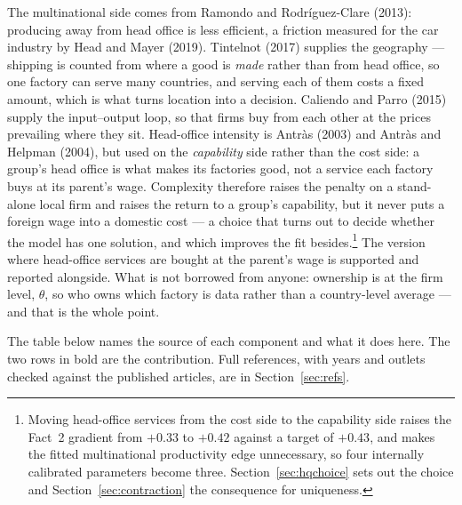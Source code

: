 \documentclass[11pt]{article}
\theoremstyle{plain}
\theoremstyle{remark}
\theoremstyle{definition}
\begin{document}
The multinational side comes from Ramondo and Rodr\'iguez-Clare (2013): producing away
from head office is less efficient, a friction measured for the car industry by Head and
Mayer (2019). Tintelnot (2017) supplies the geography --- shipping is counted from where
a good is \emph{made} rather than from head office, so one factory can serve many
countries, and serving each of them costs a fixed amount, which is what turns location
into a decision. Caliendo and Parro (2015) supply the input--output loop, so that firms
buy from each other at the prices prevailing where they sit. Head-office intensity is
Antr\`as (2003) and Antr\`as and Helpman (2004), but used on the \emph{capability} side
rather than the cost side: a group's head office is what makes its factories good, not a
service each factory buys at its parent's wage. Complexity therefore raises the penalty
on a stand-alone local firm and raises the return to a group's capability, but it never
puts a foreign wage into a domestic cost --- a choice that turns out to decide whether
the model has one solution, and which improves the fit besides.\footnote{Moving
head-office services from the cost side to the capability side raises the Fact~2
gradient from $+0.33$ to $+0.42$ against a target of $+0.43$, and makes the fitted
multinational productivity edge unnecessary, so four internally calibrated parameters
become three. Section~\ref{sec:hqchoice} sets out the choice and
Section~\ref{sec:contraction} the consequence for uniqueness.} The version where
head-office services are bought at the parent's wage is supported and reported
alongside. What is not borrowed from anyone: ownership is at the firm level, $\theta$,
so who owns which factory is data rather than a country-level average --- and that is
the whole point.

\noindent The table below names the source of each component and what it does here. The
two rows in bold are the contribution. Full references, with years and outlets checked
against the published articles, are in Section~\ref{sec:refs}.
\end{document}
